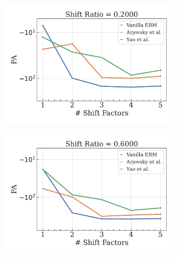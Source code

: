 \begin{figure}[H]
    \centering
    \begin{subfigure}[b]{0.32\textwidth}
        \centering
        \includegraphics[width=\textwidth]{img/results_discussion/datashift/shift_ratio=0.200.pdf}
    \end{subfigure}
    \hfill
    \begin{subfigure}[b]{0.32\textwidth}
        \centering
        \includegraphics[width=\textwidth]{img/results_discussion/datashift/shift_ratio=0.600.pdf}
    \end{subfigure}
    \hfill
    \begin{subfigure}[b]{0.32\textwidth}
        \centering

\end{subfigure}
\end{figure}
